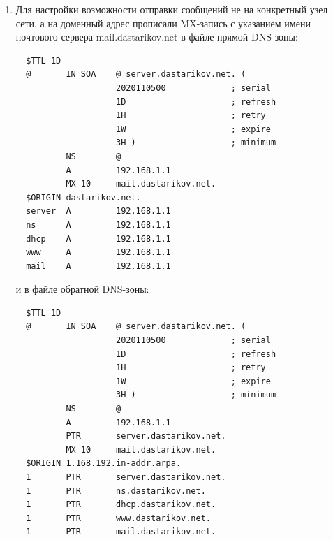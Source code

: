 \begin{enumerate}
\item Для настройки возможности отправки сообщений не на конкретный узел сети, а на доменный адрес прописали MX-запись с указанием имени почтового сервера mail.dastarikov.net в файле прямой DNS-зоны:
  \begin{verbatim}
  $TTL 1D
  @       IN SOA    @ server.dastarikov.net. (
                    2020110500             ; serial
                    1D                     ; refresh
                    1H                     ; retry
                    1W                     ; expire
                    3H )                   ; minimum
          NS        @
          A         192.168.1.1
          MX 10     mail.dastarikov.net.
  $ORIGIN dastarikov.net.
  server  A         192.168.1.1
  ns      A         192.168.1.1
  dhcp    A         192.168.1.1
  www     A         192.168.1.1
  mail    A         192.168.1.1
  \end{verbatim}
и в файле обратной DNS-зоны:
\begin{verbatim}
  $TTL 1D
  @       IN SOA    @ server.dastarikov.net. (
                    2020110500             ; serial
                    1D                     ; refresh
                    1H                     ; retry
                    1W                     ; expire
                    3H )                   ; minimum
          NS        @
          A         192.168.1.1
          PTR       server.dastarikov.net.
          MX 10     mail.dastarikov.net.
  $ORIGIN 1.168.192.in-addr.arpa.
  1       PTR       server.dastarikov.net.
  1       PTR       ns.dastarikov.net.
  1       PTR       dhcp.dastarikov.net.
  1       PTR       www.dastarikov.net.
  1       PTR       mail.dastarikov.net.
\end{verbatim}


\end{enumerate}
